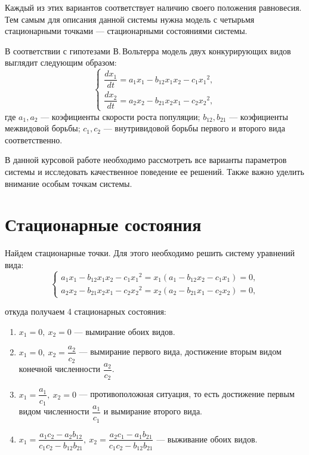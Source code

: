 \documentclass[12pt,a4paper]{article}
\begin{document}
    Каждый из этих вариантов соответствует наличию своего положения равновесия. Тем самым для описания данной системы нужна модель с четырьмя стационарными точками --- стационарными состояниями системы.

    В соответствии с гипотезами В.\,Вольтерра модель двух конкурирующих видов выглядит следующим образом:
    \begin{equation}
        \label{volterra}
        \begin{cases}
            \dfrac{dx_1}{dt} = a_1 x_1 - b_{12} x_1 x_2 - c_1 {x_1}\!^2,
            \\[1em]
            \dfrac{dx_2}{dt} = a_2 x_2 - b_{21} x_2 x_1 - c_2 {x_2}\!^2 ,
        \end{cases}
    \end{equation}
    \noindent где $a_1, a_2$ --- коэфициенты скорости роста популяции; $b_{12}, b_{21}$ --- коэфициенты межвидовой борьбы; $c_1, c_2$ --- внутривидовой борьбы первого и второго вида соответственно.

    В данной курсовой работе необходимо рассмотреть все варианты параметров системы и исследовать качественное поведение ее решений. Также важно уделить внимание особым точкам системы.

    \section{Стационарные состояния}

    Найдем стационарные точки. Для этого необходимо решить систему уравнений вида: 
    \begin{equation}
        \label{seps}
        \begin{cases}
            a_1 x_1 - b_{12} x_1 x_2 - c_1 {x_1}\!^2 = x_1 (a_1 - b_{12} x_2 - c_1 x_1) = 0,
            \\
            a_2 x_2 - b_{21} x_2 x_1 - c_2 {x_2}\!^2 = x_2 (a_2 - b_{21} x_1 - c_2 x_2) = 0,
        \end{cases}
    \end{equation}
    
    \noindent откуда получаем 4 стационарных состояния:
    \begin{enumerate}
        \setlength\itemsep{0.5em}
        \item $ x_1 = 0,\ x_2 = 0 $ --- вымирание обоих видов.
        \item $ x_1 = 0,\ x_2 = \dfrac{a_2}{c_2} $ --- вымирание первого вида, достижение вторым видом конечной численности $ \dfrac{a_2}{c_2} $.
        \item $ x_1 = \dfrac{a_1}{c_1},\ x_2 = 0 $ --- противоположная ситуация, то есть достижение первым видом численности $ \dfrac{a_1}{c_1} $ и вымирание второго вида.
        \item $ x_1 = \dfrac{a_1 c_2 - a_2 b_{12}}{c_1 c_2 - b_{12} b_{21}},\ x_2 = \dfrac{a_2 c_1 - a_1 b_{21}}{c_1 c_2 - b_{12} b_{21}}$ --- выживание обоих видов.
    \end{enumerate} 
\end{document}
